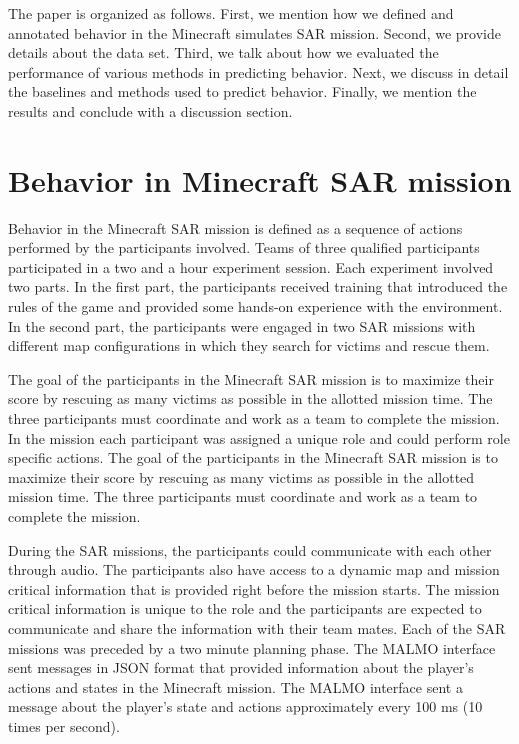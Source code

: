 \documentclass{article}
\begin{document}
The paper is organized as follows. First, we mention how we
defined and annotated behavior in the Minecraft simulates SAR mission. Second, 
we provide details about the data set. Third, we talk about how we evaluated the
performance of various methods in predicting behavior. Next, we discuss in detail the 
baselines and methods used to predict behavior. Finally, we mention the results 
and conclude with a discussion section.

\section*{Behavior in Minecraft SAR mission}
Behavior in the Minecraft SAR mission is defined as a sequence of actions performed by
the participants involved. Teams of three qualified participants
participated in a two and a hour experiment session. Each experiment involved 
two parts. In the first part, the participants received
training that introduced the rules of the game and provided some
hands-on experience with the environment. In the second part, the participants 
were engaged in two SAR missions with different map configurations in which 
they search for victims and rescue them. 

The goal of the participants in the Minecraft SAR mission is to maximize their score 
by rescuing as many victims as possible in the allotted mission time. The three 
participants must coordinate and work as a team to complete the mission.
In the mission each participant was assigned a unique role
and could perform role specific actions. The goal of the participants in the Minecraft
SAR mission is to maximize their score by rescuing as many victims as possible in the
allotted mission time. The three participants must coordinate and work as a team to
complete the mission.

During the SAR
missions, the participants could communicate with each other through audio. The
participants also have access to a dynamic map and mission critical information that
is provided right before the mission starts. The mission critical information is 
unique to the role and the participants are expected to communicate and share the 
information
with their team mates. Each of the SAR missions was preceded by a two minute planning
phase. The MALMO interface sent messages in JSON format that provided information 
about the player's actions and states in the Minecraft mission. The MALMO interface 
sent a message about the player's state and actions approximately every 100 ms 
(10 times per second).
\end{document}
